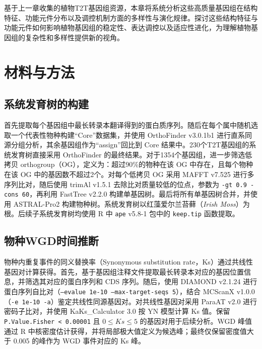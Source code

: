 基于上一章收集的植物T2T基因组资源，本章将系统分析这些高质量基因组在结构特征、功能元件分布以及调控机制方面的多样性与演化规律。探讨这些结构特征与功能元件如何影响植物基因组的稳定性、表达调控以及适应性进化，为理解植物基因组的复杂性和多样性提供新的视角。

\section{材料与方法}

\subsection{系统发育树的构建}
首先提取每个基因组中最长转录本翻译得到的蛋白质序列。随后在每个属中随机选取一个代表性物种构建“Core”数据集，并使用 OrthoFinder v3.0.1b1 进行直系同源分组分析\cite{emms2019orthofinder}，其余基因组作为“assign”回比到 Core 结果中。230个T2T基因组的系统发育树直接采用 OrthoFinder 的最终结果。对于1354个基因组，进一步筛选低拷贝 orthogroup（OG），定义为：超过90\%的物种在该 OG 中存在，且每个物种在该 OG 中的基因数不超过2个。对每个低拷贝 OG 采用 MAFFT v7.525 进行多序列比对\cite{katoh2002mafft}，随后使用 trimAl v1.5.1 去除比对质量较低的位点，参数为 \texttt{-gt 0.9 -cons 60}\cite{capella2009trimal}，再利用 FastTree v2.2.0 构建单基因树\cite{price2009fasttree}。最后将所有单基因树合并，并使用 ASTRAL-Pro2 构建物种树\cite{zhang2020astral}。系统发育树以红藻爱尔兰苔藓（\textit{Irish Moss}）为根。后续子系统发育树均使用 R 中 \texttt{ape} v5.8-1 包中的 \texttt{keep.tip} 函数提取\cite{paradis2004ape}。

\subsection{物种WGD时间推断}

物种内重复事件的同义替换率（Synonymous substitution rate，Ks）通过共线性基因对计算获得。首先，基于基因组注释文件提取最长转录本对应的基因位置信息，并筛选其对应的蛋白序列和 CDS 序列。随后，使用 DIAMOND v2.1.24 进行蛋白序列自比对（\texttt{--evalue 1e-10 --max-target-seqs 5}）\cite{buchfink2015fast}，结合 MCScanX v1.0.0（\texttt{-e 1e-10 -a}）鉴定共线性同源基因对\cite{wang2012mcscanx}。对共线性基因对采用 ParaAT v2.0 进行密码子比对\cite{zhang2012paraat}，并使用 KaKs\_Calculator 3.0 按 YN 模型计算 Ks 值\cite{zhang2022kaks_calculator}。保留 \texttt{P.Value.Fisher < 0.00001} 且 \(0 \leq Ks \leq 5\) 的基因对用于后续分析。WGD 峰值通过 R 中核密度估计获得，并将局部极大值定义为候选峰；最终仅保留密度值大于 0.005 的峰作为 WGD 事件对应的 Ks 峰。


